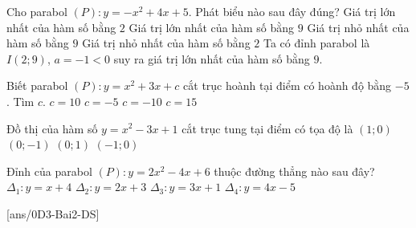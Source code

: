 \begin{ex}%
	Cho parabol $(P)\colon y=-x^2+4 x+5$. Phát biểu nào sau đây đúng?
	\choice
	{Giá trị lớn nhất của hàm số bằng $2$}
	{\True Giá trị lớn nhất của hàm số bằng $9$}
	{Giá trị nhỏ nhất của hàm số bằng $9$}
	{Giá trị nhỏ nhất của hàm số bằng $2$}
	\loigiai
	{
		Ta có đỉnh parabol là $I\left(2;9\right)$, $a=-1<0$ suy ra giá trị lớn nhất của hàm số bằng $9$.
	}
\end{ex}

\begin{ex}%
	Biết parabol $\left(P\right)\colon y=x^2+3x+c$ cắt trục hoành tại điểm có hoành độ bằng $-5$. Tìm $c$.
	\choice
	{$c=10$}
	{$c=-5$}
	{\True $c=-10$}
	{$c=15$}
\end{ex}

\begin{ex}%
	Đồ thị của hàm số $y=x^2-3x+1$ cắt trục tung tại điểm có tọa độ là
	\choice
	{$\left(1;0\right)$}
	{$\left(0;-1\right)$}
	{\True $\left(0;1\right)$}
	{$\left(-1;0\right)$}
\end{ex}

\begin{ex}%
	Đỉnh của parabol $(P)\colon y=2x^2-4x+6$ thuộc đường thẳng nào sau đây?
	\choice
	{$\Delta_1\colon y=x+4$}
	{$\Delta_2\colon y=2x+3$}
	{\True $\Delta_3\colon y=3x+1$}
	{$\Delta_4\colon y=4x-5$}
\end{ex}


 
\setcounter{ex}{0}
[ans/0D3-Bai2-DS]%




